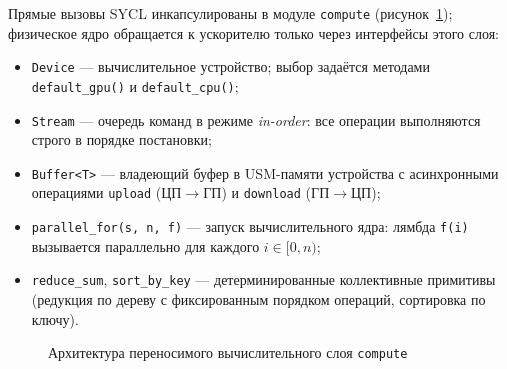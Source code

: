 Прямые вызовы SYCL инкапсулированы в модуле \texttt{compute}
(рисунок~\ref{fig:compute-arch}); физическое ядро обращается к ускорителю
только через интерфейсы этого слоя:
\begin{itemize}
  \item \texttt{Device} --- вычислительное устройство; выбор задаётся методами
        \texttt{default\_gpu()} и \texttt{default\_cpu()};
  \item \texttt{Stream} --- очередь команд в режиме \emph{in-order}: все
        операции выполняются строго в порядке постановки;
  \item \texttt{Buffer<T>} --- владеющий буфер в USM-памяти устройства с
        асинхронными операциями \texttt{upload} (ЦП$\to$ГП) и
        \texttt{download} (ГП$\to$ЦП);
  \item \texttt{parallel\_for(s, n, f)} --- запуск вычислительного ядра:
        лямбда \texttt{f(i)} вызывается параллельно для каждого
        $i \in [0, n)$;
  \item \texttt{reduce\_sum}, \texttt{sort\_by\_key} --- детерминированные
        коллективные примитивы (редукция по дереву с фиксированным порядком
        операций, сортировка по ключу).
\end{itemize}

\begin{figure}[ht]
  \centering
  \caption{Архитектура переносимого вычислительного слоя \texttt{compute}}
  \label{fig:compute-arch}
\end{figure}

